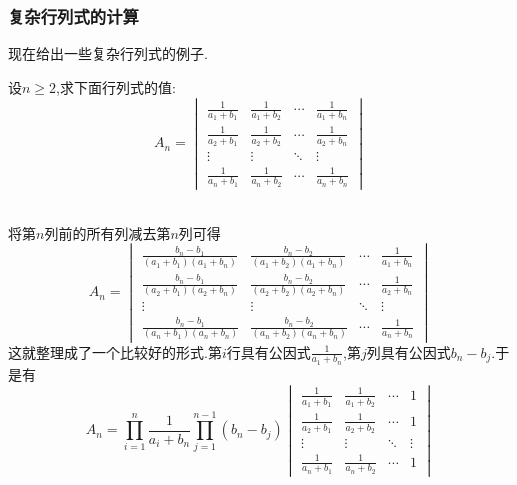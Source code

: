 \documentclass{ctexart}
\begin{document}
\subsubsection{复杂行列式的计算}
现在给出一些复杂行列式的例子.
\begin{problem}
    设$n\geq2$,求下面行列式的值:
    \[A_n=\begin{vmatrix}
        \frac{1}{a_1+b_1}&\frac{1}{a_1+b_2}&\cdots&\frac{1}{a_1+b_n}\\
        \frac{1}{a_2+b_1}&\frac{1}{a_2+b_2}&\cdots&\frac{1}{a_2+b_n}\\
        \vdots&\vdots&\ddots&\vdots\\
        \frac{1}{a_n+b_1}&\frac{1}{a_n+b_2}&\cdots&\frac{1}{a_n+b_n}
    \end{vmatrix}\]
\end{problem}
\begin{solution}
    \\
    将第$n$列前的所有列减去第$n$列可得
    \[A_n=\begin{vmatrix}
        \frac{b_n-b_1}{\left(a_1+b_1\right)\left(a_1+b_n\right)}&\frac{b_n-b_2}{\left(a_1+b_2\right)\left(a_1+b_n\right)}&\cdots&\frac{1}{a_1+b_n}\\
        \frac{b_n-b_1}{\left(a_2+b_1\right)\left(a_2+b_n\right)}&\frac{b_n-b_2}{\left(a_2+b_2\right)\left(a_2+b_n\right)}&\cdots&\frac{1}{a_2+b_n}\\
        \vdots&\vdots&\ddots&\vdots\\
        \frac{b_n-b_1}{\left(a_n+b_1\right)\left(a_n+b_n\right)}&\frac{b_n-b_2}{\left(a_n+b_2\right)\left(a_n+b_n\right)}&\cdots&\frac{1}{a_n+b_n}
    \end{vmatrix}\]
    这就整理成了一个比较好的形式.第$i$行具有公因式$\frac{1}{a_1+b_n}$,第$j$列具有公因式$b_n-b_j$.于是有
    \[A_n=\prod_{i=1}^{n}\dfrac{1}{a_i+b_n}\prod_{j=1}^{n-1}\left(b_n-b_j\right)\begin{vmatrix}
        \frac{1}{a_1+b_1}&\frac{1}{a_1+b_2}&\cdots&1\\
        \frac{1}{a_2+b_1}&\frac{1}{a_2+b_2}&\cdots&1\\
        \vdots&\vdots&\ddots&\vdots\\
        \frac{1}{a_n+b_1}&\frac{1}{a_n+b_2}&\cdots&1
    \end{vmatrix}\]
    \\

\end{solution}
\end{document}

